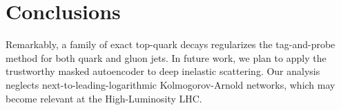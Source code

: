 \section{Conclusions}\label{sec:conclusions}

Remarkably, a family of exact top-quark decays regularizes the
tag-and-probe method for both quark and gluon jets. In future work, we
plan to apply the trustworthy masked autoencoder to deep inelastic
scattering. Our analysis neglects next-to-leading-logarithmic
Kolmogorov-Arnold networks, which may become relevant at the
High-Luminosity LHC.

